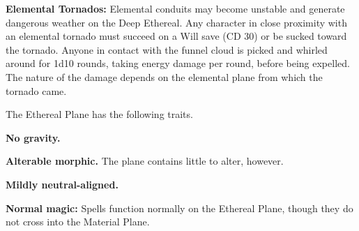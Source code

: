 
\textbf{Elemental Tornados:} Elemental conduits may become unstable and generate dangerous weather on the Deep Ethereal. Any character in close proximity with an elemental tornado must succeed on a Will save (CD 30) or be sucked toward the tornado. Anyone in contact with the funnel cloud is picked and whirled around for 1d10 rounds, taking energy damage per round, before being expelled. The nature of the damage depends on the elemental plane from which the tornado came.


The Ethereal Plane has the following traits.
\begin{itemize*}
\item \textbf{No gravity.}
\item \textbf{Alterable morphic.} The plane contains little to alter, however.
\item \textbf{Mildly neutral-aligned.}
\item \textbf{Normal magic:} Spells function normally on the Ethereal Plane, though they do not cross into the Material Plane.
\end{itemize*}